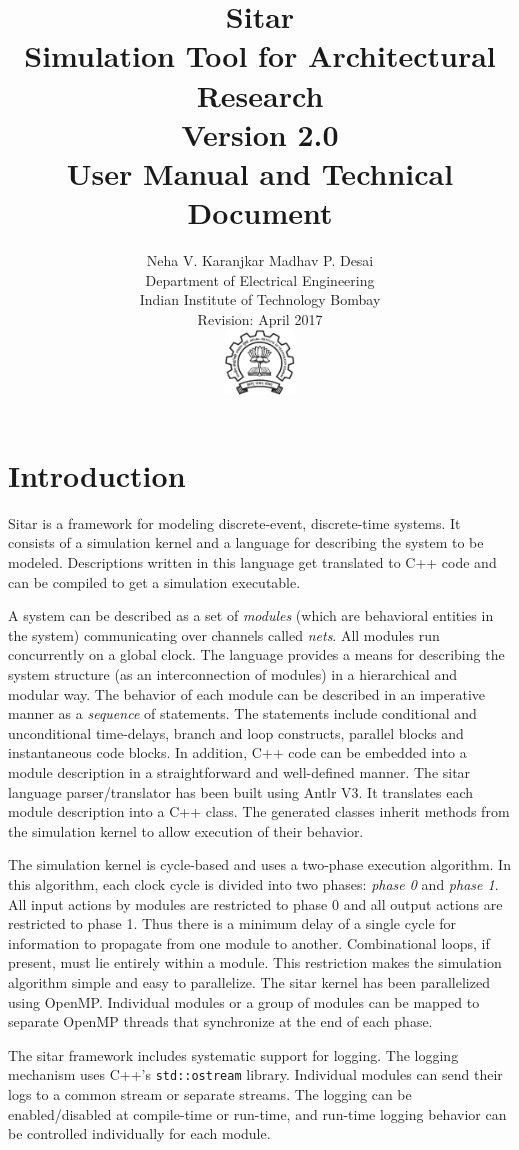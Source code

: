 \documentclass[12pt,a4paper]{report}
\title{
{\Huge Sitar}\\
{\Large Simulation Tool for Architectural Research}\\
{\small Version 2.0}\\[2em]
{\large User Manual and Technical Document}
}
\author{
{\small Neha V. Karanjkar \qquad Madhav P. Desai}\\
{\small Department of Electrical Engineering}\\
{\small Indian Institute of Technology Bombay}\\[1em]
{\small Revision: April 2017}\\[1em]
\includegraphics[width=5em]{iitblogo.pdf}
}
\date{}
\begin{document}
\maketitle

\tableofcontents
\chapter{Introduction}


Sitar is a framework for modeling discrete-event, discrete-time systems.  It
consists of a simulation kernel and a language for describing the system to be
modeled.  Descriptions written in this language get translated to C++ code and
can be compiled to get a simulation executable.


A system can be described as a set of {\em modules} (which are behavioral
entities in the system) communicating over channels called {\em nets}.
All modules run concurrently on a global clock. 
%
The language provides a means for describing the system structure (as an
interconnection of modules) in a hierarchical and modular way.  The behavior of
each module can be described in an imperative manner as a {\em sequence} of
statements. The statements include conditional and unconditional time-delays,
branch and loop constructs, parallel blocks and instantaneous code blocks. In
addition, C++ code can be embedded into a module description in a
straightforward and well-defined manner.  
%
The sitar language parser/translator has been built using Antlr V3\cite{Antlr}.
It translates each module description into a C++ class.
The generated classes inherit methods from the simulation kernel
to allow execution of their behavior. 

The simulation kernel is cycle-based and uses a two-phase execution
algorithm. In this algorithm, each clock cycle is divided into two
phases: {\em phase 0} and {\em phase 1}. All input actions by modules
are restricted to phase 0 and all output actions are restricted to phase 1. 
Thus there is a minimum delay of a single cycle for information to
propagate from one module to another. Combinational loops, if present,
must lie entirely within a module. This restriction makes the
simulation algorithm simple and easy to parallelize. 
%
The sitar kernel has been parallelized using OpenMP\cite{OpenMP}.
Individual modules or a group of modules can be mapped to separate
OpenMP threads that synchronize at the end of each phase.


The sitar framework includes systematic support for logging.
The logging mechanism uses C++'s {\tt std::ostream} library. Individual modules 
can send their logs to a common stream or separate streams. The logging
can be enabled/disabled at compile-time or run-time, and run-time
logging behavior can be controlled individually for each module.
\end{document}
